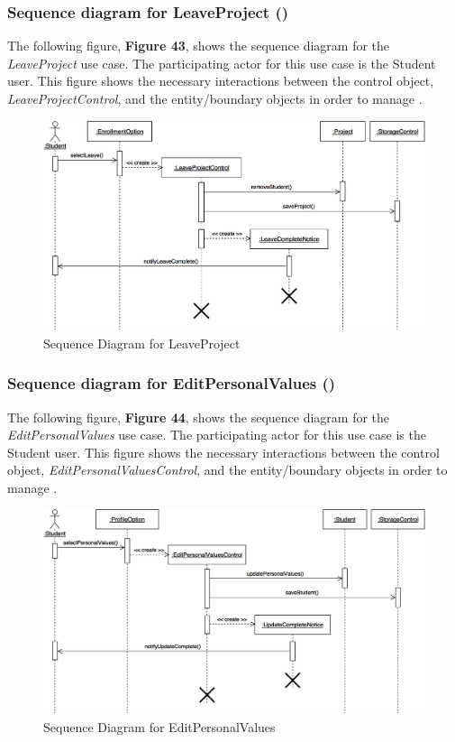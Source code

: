 \documentclass[12pt,letterpaper]{article}
\begin{document}
\subsubsection*{Sequence diagram for LeaveProject (\leaveproject{})}

The following figure, {\bf Figure 43}, shows the sequence diagram for the {\it LeaveProject} use case. The participating actor for this use case is
the Student user. This figure shows the necessary interactions between the control object, {\it LeaveProjectControl}, and the
entity/boundary objects in order to manage \leaveproject{}.

\begin{figure}[H]
	\centering{}
	\includegraphics[scale=0.3]{imgs/seq/leave-project.png}
	\caption{Sequence Diagram for LeaveProject}
\end{figure}

\subsubsection*{Sequence diagram for EditPersonalValues (\editpersonalvalues{})}

The following figure, {\bf Figure 44}, shows the sequence diagram for the {\it EditPersonalValues} use case. The participating actor for this use case is
the Student user. This figure shows the necessary interactions between the control object, {\it EditPersonalValuesControl}, and the
entity/boundary objects in order to manage \editpersonalvalues{}.

\begin{figure}[H]
	\centering{}
	\includegraphics[scale=0.3]{imgs/seq/edit-personal-values.png}
	\caption{Sequence Diagram for EditPersonalValues}
\end{figure}
\end{document}
